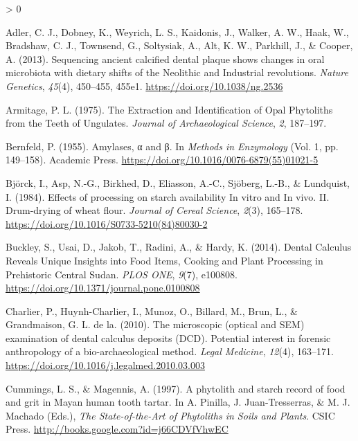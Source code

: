 \documentclass[
]{article}
\newlength{\cslhangindent}
\newenvironment{CSLReferences}[2] %
 {%
  \setlength{\parindent}{0pt}
  \ifodd #1 \everypar{\setlength{\hangindent}{\cslhangindent}}\ignorespaces\fi
  \ifnum #2 > 0
  \setlength{\parskip}{#2\baselineskip}
  \fi
 }%
 {}
\begin{document}
\hypertarget{refs}{}
\begin{CSLReferences}{1}{0}
\leavevmode\hypertarget{ref-adlerSequencingAncientCalcified2013}{}%
Adler, C. J., Dobney, K., Weyrich, L. S., Kaidonis, J., Walker, A. W., Haak, W., Bradshaw, C. J., Townsend, G., Soltysiak, A., Alt, K. W., Parkhill, J., \& Cooper, A. (2013). Sequencing ancient calcified dental plaque shows changes in oral microbiota with dietary shifts of the {Neolithic} and {Industrial} revolutions. \emph{Nature Genetics}, \emph{45}(4), 450--455, 455e1. \url{https://doi.org/10.1038/ng.2536}

\leavevmode\hypertarget{ref-armitageExtractionIdentificationOpal1975}{}%
Armitage, P. L. (1975). The {Extraction} and {Identification} of {Opal Phytoliths} from the {Teeth} of {Ungulates}. \emph{Journal of Archaeological Science}, \emph{2}, 187--197.

\leavevmode\hypertarget{ref-bernfeldAmylase1955}{}%
Bernfeld, P. (1955). Amylases, α and β. In \emph{Methods in {Enzymology}} (Vol. 1, pp. 149--158). {Academic Press}. \url{https://doi.org/10.1016/0076-6879(55)01021-5}

\leavevmode\hypertarget{ref-bjorckStarchProcessing1984}{}%
Björck, I., Asp, N.-G., Birkhed, D., Eliasson, A.-C., Sjöberg, L.-B., \& Lundquist, I. (1984). Effects of processing on starch availability {In} vitro and {In} vivo. {II}. {Drum}-drying of wheat flour. \emph{Journal of Cereal Science}, \emph{2}(3), 165--178. \url{https://doi.org/10.1016/S0733-5210(84)80030-2}

\leavevmode\hypertarget{ref-buckleyDentalCalculusCooking2014}{}%
Buckley, S., Usai, D., Jakob, T., Radini, A., \& Hardy, K. (2014). Dental {Calculus Reveals Unique Insights} into {Food Items}, {Cooking} and {Plant Processing} in {Prehistoric Central Sudan}. \emph{PLOS ONE}, \emph{9}(7), e100808. \url{https://doi.org/10.1371/journal.pone.0100808}

\leavevmode\hypertarget{ref-charlierSEMCalculus2010}{}%
Charlier, P., Huynh-Charlier, I., Munoz, O., Billard, M., Brun, L., \& Grandmaison, G. L. de la. (2010). The microscopic (optical and {SEM}) examination of dental calculus deposits ({DCD}). {Potential} interest in forensic anthropology of a bio-archaeological method. \emph{Legal Medicine}, \emph{12}(4), 163--171. \url{https://doi.org/10.1016/j.legalmed.2010.03.003}

\leavevmode\hypertarget{ref-cummingsMayanCalculus1997}{}%
Cummings, L. S., \& Magennis, A. (1997). A phytolith and starch record of food and grit in {Mayan} human tooth tartar. In A. Pinilla, J. Juan-Tresserras, \& M. J. Machado (Eds.), \emph{The {State}-of-the-{Art} of {Phytoliths} in {Soils} and {Plants}}. {CSIC Press}. \url{http://books.google.com?id=j66CDVfVhwEC}


\end{CSLReferences}
\end{document}
